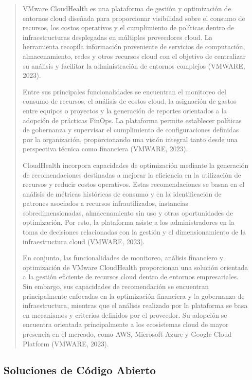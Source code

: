 \documentclass[
]{article}
\begin{document}
\begin{quote}
VMware CloudHealth es una plataforma de gestión y optimización de
entornos cloud diseñada para proporcionar visibilidad sobre el consumo
de recursos, los costos operativos y el cumplimiento de políticas dentro
de infraestructuras desplegadas en múltiples proveedores cloud. La
herramienta recopila información proveniente de servicios de
computación, almacenamiento, redes y otros recursos cloud con el
objetivo de centralizar su análisis y facilitar la administración de
entornos complejos (VMWARE, 2023).

Entre sus principales funcionalidades se encuentran el monitoreo del
consumo de recursos, el análisis de costos cloud, la asignación de
gastos entre equipos o proyectos y la generación de reportes orientados
a la adopción de prácticas FinOps. La plataforma permite establecer
políticas de gobernanza y supervisar el cumplimiento de configuraciones
definidas por la organización, proporcionando una visión integral tanto
desde una perspectiva técnica como financiera (VMWARE, 2023).

CloudHealth incorpora capacidades de optimización mediante la generación
de recomendaciones destinadas a mejorar la eficiencia en la utilización
de recursos y reducir costos operativos. Estas recomendaciones se basan
en el análisis de métricas históricas de consumo y en la identificación
de patrones asociados a recursos infrautilizados, instancias
sobredimensionadas, almacenamiento sin uso y otras oportunidades de
optimización. Por esto, la plataforma asiste a los administradores en la
toma de decisiones relacionadas con la gestión y el dimensionamiento de
la infraestructura cloud (VMWARE, 2023).

En conjunto, las funcionalidades de monitoreo, análisis financiero y
optimización de VMware CloudHealth proporcionan una solución orientada a
la gestión eficiente de recursos cloud dentro de entornos empresariales.
Sin embargo, sus capacidades de recomendación se encuentran
principalmente enfocadas en la optimización financiera y la gobernanza
de infraestructura, mientras que el análisis realizado por la plataforma
se basa en mecanismos y criterios definidos por el proveedor. Su
adopción se encuentra orientada principalmente a los ecosistemas cloud
de mayor presencia en el mercado, como AWS, Microsoft Azure y Google
Cloud Platform (VMWARE, 2023).
\end{quote}

\subsection{\texorpdfstring{ Soluciones de Código
Abierto}{ Soluciones de Código Abierto}}\label{soluciones-de-cuxf3digo-abierto}
\end{document}

